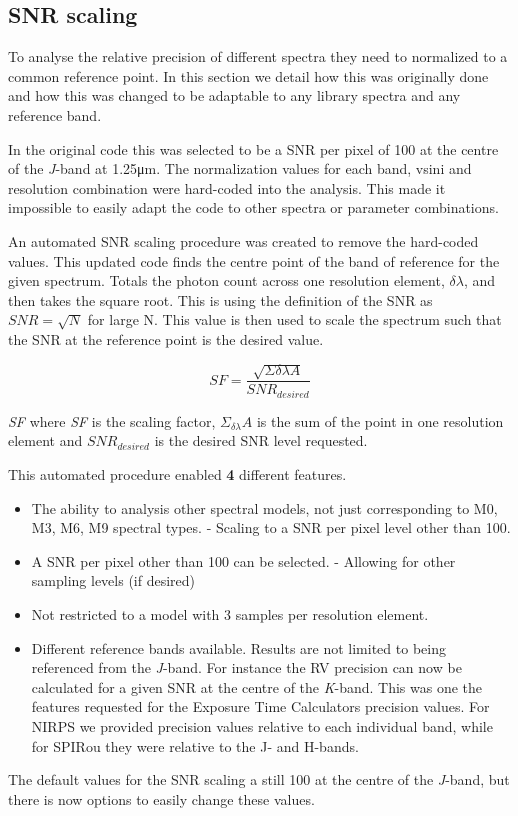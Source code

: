 \subsection{SNR scaling}
\label{subsec:snr_scaling}
To analyse the relative precision of different spectra they need to normalized to a common reference point. In this section we detail how this was originally done and how this was changed to be adaptable to any library spectra and any reference band.

In the original code this was selected to be a {SNR} per pixel of 100 at the centre of the \textit{J}-band at 1.25\si{\micro\meter}. The normalization values for each band, vsini and resolution combination were hard-coded into the analysis. This made it impossible to easily adapt the code to other spectra or parameter combinations.

An automated {SNR} scaling procedure was created to remove the hard-coded values. This updated code finds the centre point of the band of reference for the given spectrum. Totals the photon count across one resolution element, \(\delta\lambda\), and then takes the square root. This is using the definition of the {SNR} as \({SNR} = \sqrt{N}\) for large N. This value is then used to scale the spectrum such that the {SNR} at the reference point is the desired value.

\begin{equation}
    SF =  \frac{\sqrt{\Sigma{\delta\lambda} A}} {SNR_{desired}}
\end{equation}

\textit{SF} where \textit{SF} is the scaling factor, \(\Sigma_{\delta\lambda} A\) is the sum of the point in one resolution element and \({SNR}_{desired}\) is the desired {SNR} level requested.

This automated procedure enabled {\red{}\textbf{4}} different features.
\begin{itemize}
\item The ability to analysis other spectral models, not just corresponding to {M0}, {M3}, {M6}, {M9} spectral types.
    - Scaling to a {SNR} per pixel level other than 100.
\item    A {SNR} per pixel other than 100 can be selected.
    - Allowing for other sampling levels (if desired)
\item      Not restricted to a model with 3 samples per resolution element.
\item Different reference bands available.
    Results are not limited to being referenced from the \textit{J}-band. For instance the {RV} precision can now be calculated for a given {SNR} at the centre of the \textit{K}-band. This was one the features requested for the Exposure Time Calculators precision values. For NIRPS we provided precision values relative to each individual band, while for SPIRou they were relative to the {J}- and {H}-bands.
\end{itemize}
The default values for the {SNR} scaling a still 100 at the centre of the \textit{J}-band, but there is now options to easily change these values.

